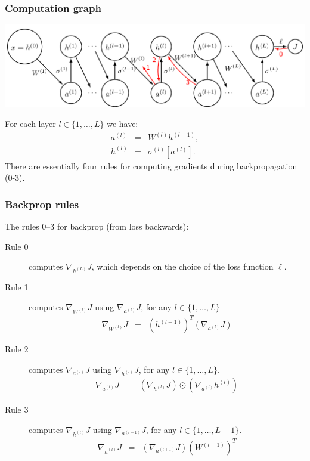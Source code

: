 \documentclass{beamer}
\begin{document}
\begin{frame}
  \frametitle{Computation graph}
  \includegraphics[width=\textwidth]{screenshot-backprop-figure}

For
each layer $l\in \{1, \dots, L\}$ we have:
\begin{eqnarray*}
  a^{(l)} &=&  W^{(l)} h^{(l-1)}, \\
  h^{(l)} &=& \sigma^{(l)}\left[ a^{(l)} \right].
\end{eqnarray*}
There are essentially four rules for computing gradients during
backpropagation (0-3).
  
\end{frame}

\begin{frame}
  \frametitle{Backprop rules}
  The rules 0--3 for backprop (from loss backwards):
\begin{description}
\item[Rule 0] computes $\nabla_{h^{(L)}} J$, which depends on the
  choice of the loss function $\ell$.
\item[Rule 1] computes
  $\nabla_{W^{(l)}} J$ using $\nabla_{a^{(l)}} J$, for any $l\in\{1,\dots,L\}$
\begin{eqnarray}
  \nabla_{W^{(l)}} J
  &=& \left( h^{(l-1)} \right)^T
      \left(\nabla_{a^{(l)}} J\right)
       \label{eq:grad-loss-w}
\end{eqnarray}
\item[Rule 2] computes
  $\nabla_{a^{(l)}} J$ using $\nabla_{h^{(l)}} J$, for any $l\in\{1,\dots,L\}$.
\begin{eqnarray}
  \nabla_{a^{(l)}} J
  &=& \left(\nabla_{h^{(l)}} J\right) \odot
      \label{eq:grad-loss-a}
      \left(\nabla_{a^{(l)}} h^{(l)} \right) 
\end{eqnarray}
\item[Rule 3] computes
  $\nabla_{h^{(l)}} J$ using $\nabla_{a^{(l+1)}} J$, for any $l\in\{1,\dots,L-1\}$.
\begin{eqnarray}
  \nabla_{h^{(l)}} J
  &=& \left(\nabla_{a^{(l+1)}} J\right)
      \left(W^{(l+1)}\right)^T \label{eq:grad-loss-h}
\end{eqnarray}
\end{description}

\end{frame}
\end{document}
